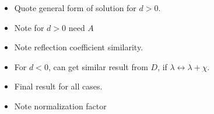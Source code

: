 \begin{itemize}
    \item Quote general form of solution for $d>0$.  
    \item{Note for $d>0$ need $A$}
  \item Note reflection coefficient similarity.  
  \item For $d<0$, can get similar result from $D$, if $\lambda \leftrightarrow \lambda+\chi$.
  \item Final result for all cases.  
  \item Note normalization factor

\end{itemize}

